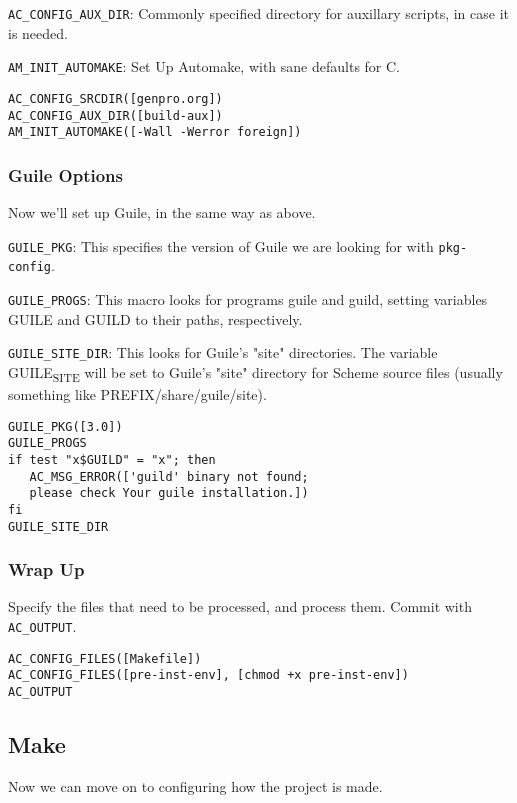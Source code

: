 \documentclass[11pt]{article}
\begin{document}
\texttt{AC\_CONFIG\_AUX\_DIR}: Commonly specified directory for auxillary scripts, in case
it is needed.

\texttt{AM\_INIT\_AUTOMAKE}: Set Up Automake, with sane defaults for C.

\begin{verbatim}
AC_CONFIG_SRCDIR([genpro.org])
AC_CONFIG_AUX_DIR([build-aux])
AM_INIT_AUTOMAKE([-Wall -Werror foreign])
\end{verbatim}

\subsubsection{Guile Options}
\label{sec:org40eba3b}
Now we'll set up Guile, in the same way as above.

\texttt{GUILE\_PKG}: This specifies the version of Guile we are looking for with
\texttt{pkg-config}.

\texttt{GUILE\_PROGS}: This macro looks for programs guile and guild, setting variables
GUILE and GUILD to their paths, respectively.

\texttt{GUILE\_SITE\_DIR}: This looks for Guile’s "site" directories. The variable
GUILE\textsubscript{SITE} will be set to Guile’s "site" directory for Scheme source files
(usually something like PREFIX/share/guile/site).

\begin{verbatim}
GUILE_PKG([3.0])
GUILE_PROGS
if test "x$GUILD" = "x"; then
   AC_MSG_ERROR(['guild' binary not found;
   please check Your guile installation.])
fi
GUILE_SITE_DIR
\end{verbatim}

\subsubsection{Wrap Up}
\label{sec:orgbd0c780}
Specify the files that need to be processed, and process them. Commit with
\texttt{AC\_OUTPUT}.

\begin{verbatim}
AC_CONFIG_FILES([Makefile])
AC_CONFIG_FILES([pre-inst-env], [chmod +x pre-inst-env])
AC_OUTPUT
\end{verbatim}

\subsection{Make}
\label{sec:orgcec31aa}
Now we can move on to configuring how the project is made.
\end{document}
